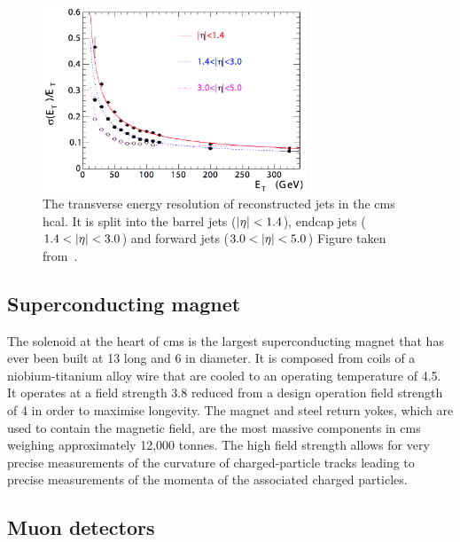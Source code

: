 \begin{figure}[htpb]
	\centering
	\includegraphics[width=0.7\textwidth]{Figures/CMSHCALRES}
	\caption[The transverse energy resolution of reconstructed jets in the \acrshort{cms} \acrshort{hcal}. It is split into the barrel jets ($\abseta<1.4$), endcap jets ($1.4<\abseta<3.0$) and forward jets ($3.0<\abseta<5.0$)]{The transverse energy resolution of reconstructed jets in the \acrshort{cms} \acrshort{hcal}. It is split into the barrel jets ($\abseta<1.4$), endcap jets ($1.4<\abseta<3.0$) and forward jets ($3.0<\abseta<5.0$) Figure taken from~\cite{CMSExperiment}.}
	\label{fig:CMSHCALRes}
\end{figure}

\subsection{Superconducting magnet}
\label{ssec:Magnet}

The solenoid at the heart of \acrshort{cms} is the largest superconducting magnet that has ever been built at 13\m{} long and 6\m{} in diameter.
It is composed from coils of a niobium-titanium alloy wire that are cooled to an operating temperature of 4.5\Kelvin{}. 
It operates at a field strength 3.8\Tesla{} reduced from a design operation field strength of 4\Tesla{} in order to maximise longevity.
The magnet and steel return yokes, which are used to contain the magnetic field, are the most massive components in \acrshort{cms} weighing approximately 12,000 tonnes.
The high field strength allows for very precise measurements of the curvature of charged-particle tracks leading to precise measurements of the momenta of the associated charged particles.

\subsection{Muon detectors}
\label{ssec:MuonChambers}

